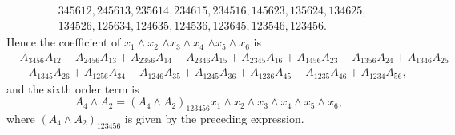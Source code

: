 \documentclass[aps, preprint]{revtex4}
\begin{document}
\begin{align} & 345612,245613,235614,234615,234516,145623,135624,134625 , \nonumber  \\
 & 134526,125634,124635,124536,123645,123546,123456.\end{align}Hence the coefficient of $x_{1} \wedge x_{2}$ $ \wedge x_{3} \wedge x_{4}$ $ \wedge x_{5} \wedge x_{6}$ is
\begin{align} & A_{3 4 5 6} A_{1 2} -A_{2 4 5 6} A_{1 3} +A_{2 3 5 6} A_{1 4} -A_{2 3 4 6} A_{1 5} +A_{2 3 4 5} A_{1 6} +A_{1 4 5 6} A_{2 3} -A_{1 3 5 6} A_{2 4} +A_{1 3 4 6} A_{2 5} \nonumber  \\
 &  -A_{1 3 4 5} A_{2 6} +A_{1 2 5 6} A_{3 4} -A_{1 2 4 6} A_{3 5} +A_{1 2 4 5} A_{3 6} +A_{1 2 3 6} A_{4 5} -A_{1 2 3 5} A_{4 6} +A_{1 2 3 4} A_{5 6}\text{,}\end{align}and the sixth order term is
\begin{equation}A_{4} \wedge A_{2} =\left (A_{4} \wedge A_{2}\right )_{1 2 3 4 5 6} x_{1} \wedge x_{2} \wedge x_{3} \wedge x_{4} \wedge x_{5} \wedge x_{6}\text{,}
\end{equation}where $\left (A_{4} \wedge A_{2}\right )_{1 2 3 4 5 6}$ is given by the preceding expression. 
\end{document}
